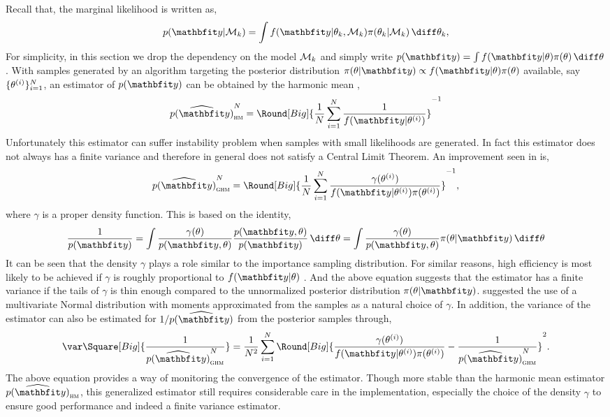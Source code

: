 Recall that, the marginal likelihood is written as,
\begin{equation*}
  p(\data|\calM_k) = \int
  f(\data|\theta_k,\calM_k)\pi(\theta_k|\calM_k)\intd\theta_k,
\end{equation*}
For simplicity, in this section we drop the dependency on the model $\mathcal{M}_k$
and simply write $p(\data) = \int f(\data|\theta)\pi(\theta)\intd\theta$.
With samples generated by an \mcmc algorithm targeting the posterior
distribution $\pi(\theta|\data) \propto f(\data|\theta) \pi(\theta)$
available, say $\{\theta^{(i)}\}_{i=1}^N$, an estimator of $p(\data)$ can be
obtained by the harmonic mean \cite{Newton:1994wm},
\begin{equation}
  \widehat{p(\data)}_{\text{\textsc{hm}}}^N =
  \Round[Big]{\frac{1}{N}\sum_{i=1}^N\frac{1}{f(\data|\supi\theta)}}^{-1}
\end{equation}
Unfortunately this estimator can suffer instability problem when samples with
small likelihoods are generated. In fact this estimator does not always has a
finite variance and therefore in general does not satisfy a Central Limit
Theorem. An improvement seen in \cite{Kass:1995vb} is,
\begin{equation}
  \widehat{p(\data)}_{\text{\textsc{ghm}}}^N = \Round[Big]{
    \frac{1}{N}\sum_{i=1}^N
    \frac{\gamma(\supi\theta)}{f(\data|\supi\theta)\pi(\supi\theta)}}^{-1},
\end{equation}
where $\gamma$ is a proper density function. This is based on the identity,
\begin{equation}
  \frac{1}{p(\data)}
  = \int \frac{\gamma(\theta)}{p(\data,\theta)}
  \frac{p(\data,\theta)}{p(\data)} \intd \theta
  = \int \frac{\gamma(\theta)}{p(\data,\theta)} \pi(\theta|\data) \intd \theta
\end{equation}
It can be seen that the density $\gamma$ plays a role similar to the
importance sampling distribution. For similar reasons, high efficiency is most
likely to be achieved if $\gamma$ is roughly proportional to $f(\data|\theta)$
\cite{Kass:1995vb}. And the above equation suggests that the estimator has a
finite variance if the tails of $\gamma$ is thin enough compared to the
unnormalized posterior distribution $\pi(\theta|\data)$.
\cite{Gelfand:1994ux} suggested the use of a multivariate Normal distribution
with moments approximated from the samples as a natural choice of $\gamma$. In
addition, the variance of the estimator can also be estimated for
$1/\widehat{p(\data)}$ from the posterior samples through,
\begin{equation}
  \var\Square[Big]{\frac{1}{\widehat{p(\data)}_{\text{\textsc{ghm}}}^N}} =
  \frac{1}{N^2}\sum_{i=1}^N \Round[Big]{
    \frac{\gamma(\supi\theta)}{f(\data|\supi\theta)\pi(\supi\theta)}
    - \frac{1}{\widehat{p(\data)}_{\text{\textsc{ghm}}}^N}}^2.
\end{equation}
The above equation provides a way of monitoring the convergence of the
estimator. Though more stable than the harmonic mean estimator
$\widehat{p(\data)}_{\text{\textsc{hm}}}$, this generalized estimator still
requires considerable care in the implementation, especially the choice of the
density $\gamma$ to ensure good performance and indeed a finite variance
estimator.


